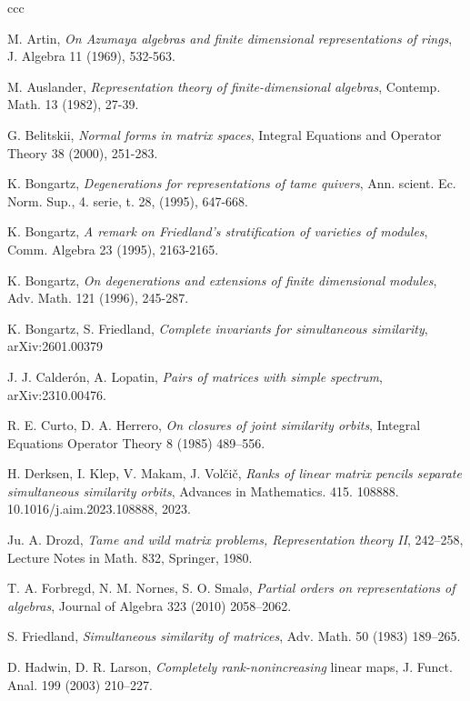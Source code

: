 \documentclass[12pt]{amsart}
\begin{document}
\begin{thebibliography}{ccc}

 M. Artin, \textit{On Azumaya algebras and finite dimensional
representations of rings}, J. Algebra 11 (1969), 532-563.  


M. Auslander, \textit{Representation theory of finite-dimensional algebras}, Contemp. Math. 13 (1982), 27-39.

G. Belitskii, \textit{Normal forms in matrix spaces}, 
Integral Equations and Operator Theory 38 (2000), 251-283. 

K. Bongartz, \textit{Degenerations for representations of tame quivers}, Ann. scient. Ec. Norm. Sup., 4. serie, t. 28, (1995), 647-668.

K. Bongartz, \textit{A remark on Friedland's stratification of varieties of modules}, 
Comm. Algebra 23 (1995), 2163-2165. 


K. Bongartz, \textit{On degenerations and extensions of finite dimensional modules}, 
Adv. Math. 121 (1996), 245-287. 

K. Bongartz, S. Friedland, 
\textit{Complete invariants for simultaneous similarity}, 	arXiv:2601.00379

J. J. Calderón, A. Lopatin, 
\textit{Pairs of matrices with simple spectrum}, 
arXiv:2310.00476.

R. E. Curto, D. A. Herrero, \textit{On closures of joint similarity orbits}, Integral Equations Operator
Theory 8 (1985) 489–556.

H. Derksen, I. Klep, V. Makam, J. Volčič, \textit{Ranks of linear matrix pencils separate simultaneous similarity orbits}, Advances in Mathematics. 415. 108888. 10.1016/j.aim.2023.108888, 2023.

Ju. A. Drozd, \textit{Tame and wild matrix problems, Representation theory II}, 242–258, Lecture
Notes in Math. 832, Springer, 1980.

T. A. Forbregd, N. M. Nornes, S. O. Smalø,
\textit{Partial orders on representations of algebras},
Journal of Algebra 323 (2010) 2058–2062.

S. Friedland, \textit{Simultaneous similarity of matrices}, Adv. Math. 50 (1983) 189–265.

D. Hadwin, D. R. Larson, \textit{Completely rank-nonincreasing} linear maps, J. Funct. Anal. 199 (2003) 210–227.


\end{thebibliography}
\end{document}
